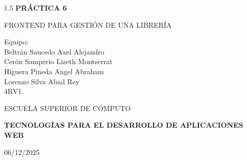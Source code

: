 \documentclass[12pt]{article}
\begin{document}

\begin{titlepage}
    \thispagestyle{empty}
    
    
    \begin{spacing}{1.5}
        {\Huge \bfseries \noindent PRÁCTICA 6}
        \vspace{10pt}

        {\LARGE FRONTEND PARA GESTIÓN DE UNA LIBRERÍA}
        
        \vspace{1cm}
        
        {\Large Equipo:} \\
        {\Large Beltrán Saucedo Axel Alejandro} \\
        {\Large Cerón Samperio Lizeth Montserrat} \\
        {\Large Higuera Pineda Angel Abraham} \\
        {\Large Lorenzo Silva Abad Rey} \\
        {\Large 4BV1.}
    \end{spacing}
    
    \vspace{1.5cm}

    \begin{minipage}{7.5cm} %
        {\Large ESCUELA SUPERIOR DE CÓMPUTO}
    \end{minipage}

    \vfill %

    \begin{flushleft}
        {\Large \color{black}
        \textbf{TECNOLOGÍAS PARA EL DESARROLLO DE APLICACIONES WEB}}
        
        \vspace{0.5cm}
        
        06/12/2025
    \end{flushleft}
    \vspace{1cm}
\end{titlepage}
\end{document}
